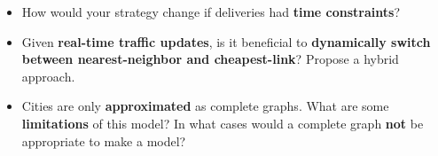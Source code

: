\documentclass[12pt]{exam}
\begin{document}
\begin{enumerate}
\begin{itemize}
    \item How would your strategy change if deliveries had \textbf{time constraints}?
    \item Given \textbf{real-time traffic updates}, is it beneficial to \textbf{dynamically switch between nearest-neighbor and cheapest-link}? Propose a hybrid approach.
    \item Cities are only \textbf{approximated} as complete graphs. What are some \textbf{limitations} of this model? In what cases would a complete graph \textbf{not} be appropriate to make a model? 
\end{itemize}
\vfill
\newpage
\ 
\newpage
\iffalse
Sol
\begin{itemize}
    \item Correctly identifies the route as Hamiltonian, with a strong justification related to visiting all locations exactly once. 
    \item Compares both algorithms, discussing strengths/weaknesses, and selects the best for static planning.
    \item Discusses the impact of time windows and suggests adjustments (e.g., prioritizing urgent deliveries). 
    \item Explains the benefits of switching strategies dynamically and proposes a hybrid method.
    \item Identifies scenarios where complete graphs fail (e.g., one-way streets, road closures, or physical barriers).
\end{itemize}
\fi
\end{enumerate}
\vfill
\end{document}

